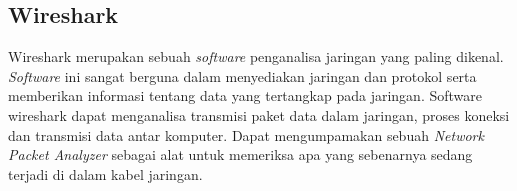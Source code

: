 			\newpage

\subsection{Wireshark}
\noindent

Wireshark merupakan sebuah \textit{software} penganalisa jaringan yang paling dikenal. \textit{Software} ini 
sangat berguna dalam menyediakan jaringan dan protokol serta memberikan informasi tentang 
data yang tertangkap pada jaringan. Software wireshark dapat menganalisa transmisi paket data 
dalam jaringan, proses koneksi dan transmisi data antar komputer. Dapat mengumpamakan 
sebuah \textit{Network Packet Analyzer} sebagai alat untuk memeriksa apa yang sebenarnya sedang 
terjadi di dalam kabel jaringan\cite{wireshark}.






